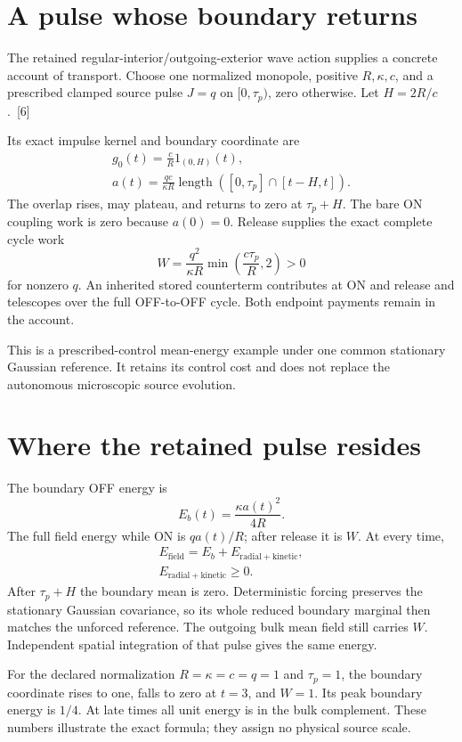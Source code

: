 \documentclass[10pt,twocolumn,letterpaper]{article}
\begin{document}
\section{A pulse whose boundary returns}
The retained regular-interior/outgoing-exterior wave action supplies a concrete account of transport. Choose one normalized monopole, positive $R,\kappa,c$, and a prescribed clamped source pulse $J=q$ on $[0,\tau_p)$, zero otherwise. Let $H=2R/c$.~[6]

Its exact impulse kernel and boundary coordinate are
\[
\begin{gathered}
g_0(t)=\frac{c}{R}1_{(0,H)}(t),\\
a(t)=\frac{qc}{\kappa R}\operatorname{length}([0,\tau_p]\cap[t-H,t]).
\end{gathered}
\]
The overlap rises, may plateau, and returns to zero at $\tau_p+H$. The bare ON coupling work is zero because $a(0)=0$. Release supplies the exact complete cycle work
\[
W=\frac{q^2}{\kappa R}\min\left(\frac{c\tau_p}{R},2\right)>0
\]
for nonzero $q$. An inherited stored counterterm contributes at ON and release and telescopes over the full OFF-to-OFF cycle. Both endpoint payments remain in the account.

This is a prescribed-control mean-energy example under one common stationary Gaussian reference. It retains its control cost and does not replace the autonomous microscopic source evolution.

\section{Where the retained pulse resides}
The boundary OFF energy is
\[
E_b(t)=\frac{\kappa a(t)^2}{4R}.
\]
The full field energy while ON is $qa(t)/R$; after release it is $W$. At every time,
\[
\begin{gathered}
E_{\mathrm{field}}=E_b+E_{\mathrm{radial}+\mathrm{kinetic}},\\
E_{\mathrm{radial}+\mathrm{kinetic}}\geq0.
\end{gathered}
\]
After $\tau_p+H$ the boundary mean is zero. Deterministic forcing preserves the stationary Gaussian covariance, so its whole reduced boundary marginal then matches the unforced reference. The outgoing bulk mean field still carries $W$. Independent spatial integration of that pulse gives the same energy.

For the declared normalization $R=\kappa=c=q=1$ and $\tau_p=1$, the boundary coordinate rises to one, falls to zero at $t=3$, and $W=1$. Its peak boundary energy is $1/4$. At late times all unit energy is in the bulk complement. These numbers illustrate the exact formula; they assign no physical source scale.
\end{document}
